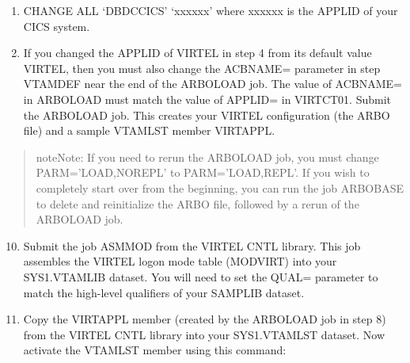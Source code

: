 \documentclass[letterpaper,10pt,english]{sphinxmanual}
\begin{document}
\begin{enumerate}
\begin{enumerate}
\item {} 
CHANGE ALL ‘DBDCCICS’ ‘xxxxxx’ where xxxxxx is the APPLID of your CICS system.

\item {} 
If you changed the APPLID of VIRTEL in step 4 from its default value VIRTEL, then you must also change the ACBNAME= parameter in step VTAMDEF near the end of the ARBOLOAD job. The value of ACBNAME= in ARBOLOAD must match the value of APPLID= in VIRTCT01. Submit the ARBOLOAD job. This creates your VIRTEL configuration (the ARBO file) and a sample VTAMLST member VIRTAPPL.

\end{enumerate}

\end{enumerate}
\begin{quote}

\begin{sphinxadmonition}{note}{Note:}
If you need to rerun the ARBOLOAD job, you must change PARM=’LOAD,NOREPL’ to PARM=’LOAD,REPL’. If you wish to completely start over from the beginning, you can run the job ARBOBASE to delete and reinitialize the ARBO file, followed by a rerun of the ARBOLOAD job.
\end{sphinxadmonition}
\end{quote}
\begin{enumerate}
\setcounter{enumi}{9}
\item {} 
Submit the job ASMMOD from the VIRTEL CNTL library. This job assembles the VIRTEL logon mode table (MODVIRT) into your SYS1.VTAMLIB dataset. You will need to set the QUAL= parameter to match the high-level qualifiers of your SAMPLIB dataset.

\item {} 
Copy the VIRTAPPL member (created by the ARBOLOAD job in step 8) from the VIRTEL CNTL library into your SYS1.VTAMLST dataset. Now activate the VTAMLST member using this command:

\end{enumerate}
\end{document}
